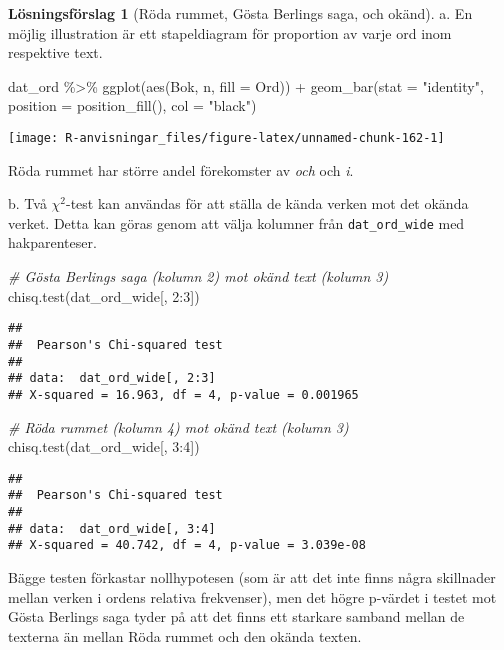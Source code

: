 \documentclass[
]{book}
\newenvironment{Shaded}{\begin{snugshade}}{\end{snugshade}}
\newcommand{\AttributeTok}[1]{\textcolor[rgb]{0.77,0.63,0.00}{#1}}
\newcommand{\CommentTok}[1]{\textcolor[rgb]{0.56,0.35,0.01}{\textit{#1}}}
\newcommand{\DecValTok}[1]{\textcolor[rgb]{0.00,0.00,0.81}{#1}}
\newcommand{\FunctionTok}[1]{\textcolor[rgb]{0.00,0.00,0.00}{#1}}
\newcommand{\NormalTok}[1]{#1}
\newcommand{\SpecialCharTok}[1]{\textcolor[rgb]{0.00,0.00,0.00}{#1}}
\newcommand{\StringTok}[1]{\textcolor[rgb]{0.31,0.60,0.02}{#1}}
\theoremstyle{definition}
\theoremstyle{definition}
\theoremstyle{definition}
\theoremstyle{definition}
\newtheorem{hypothesis}{Lösningsförslag}[chapter]
\theoremstyle{remark}
\begin{document}
\begin{hypothesis}[Röda rummet, Gösta Berlings saga, och okänd]
a. En möjlig illustration är ett stapeldiagram för proportion av varje ord inom respektive text.

\begin{Shaded}
\begin{Highlighting}[]
\NormalTok{dat\_ord }\SpecialCharTok{\%\textgreater{}\%}
  \FunctionTok{ggplot}\NormalTok{(}\FunctionTok{aes}\NormalTok{(Bok, n, }\AttributeTok{fill =}\NormalTok{ Ord)) }\SpecialCharTok{+}
  \FunctionTok{geom\_bar}\NormalTok{(}\AttributeTok{stat =} \StringTok{"identity"}\NormalTok{, }\AttributeTok{position =} \FunctionTok{position\_fill}\NormalTok{(), }\AttributeTok{col =} \StringTok{"black"}\NormalTok{)}
\end{Highlighting}
\end{Shaded}

\begin{center}\texttt{[image: R-anvisningar\_files/figure-latex/unnamed-chunk-162-1]} \end{center}

Röda rummet har större andel förekomster av \emph{och} och \emph{i}.

b. Två \(\chi^2\)-test kan användas för att ställa de kända verken mot det okända verket. Detta kan göras genom att välja kolumner från \texttt{dat\_ord\_wide} med hakparenteser.

\begin{Shaded}
\begin{Highlighting}[]
\CommentTok{\# Gösta Berlings saga (kolumn 2) mot okänd text (kolumn 3)}
\FunctionTok{chisq.test}\NormalTok{(dat\_ord\_wide[, }\DecValTok{2}\SpecialCharTok{:}\DecValTok{3}\NormalTok{])}
\end{Highlighting}
\end{Shaded}

\begin{verbatim}
## 
##  Pearson's Chi-squared test
## 
## data:  dat_ord_wide[, 2:3]
## X-squared = 16.963, df = 4, p-value = 0.001965
\end{verbatim}

\begin{Shaded}
\begin{Highlighting}[]
\CommentTok{\# Röda rummet (kolumn 4) mot okänd text (kolumn 3)}
\FunctionTok{chisq.test}\NormalTok{(dat\_ord\_wide[, }\DecValTok{3}\SpecialCharTok{:}\DecValTok{4}\NormalTok{])}
\end{Highlighting}
\end{Shaded}

\begin{verbatim}
## 
##  Pearson's Chi-squared test
## 
## data:  dat_ord_wide[, 3:4]
## X-squared = 40.742, df = 4, p-value = 3.039e-08
\end{verbatim}

Bägge testen förkastar nollhypotesen (som är att det inte finns några skillnader mellan verken i ordens relativa frekvenser), men det högre p-värdet i testet mot Gösta Berlings saga tyder på att det finns ett starkare samband mellan de texterna än mellan Röda rummet och den okända texten.
\end{hypothesis}
\end{document}
